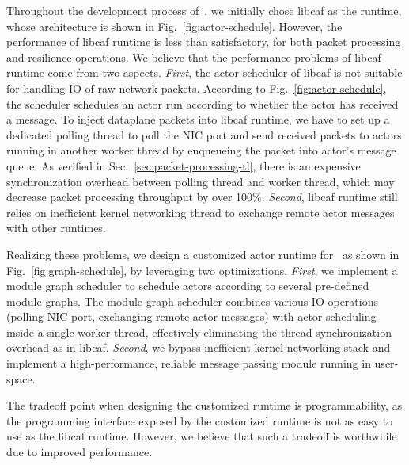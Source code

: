 Throughout the development process of~\nfactor, we initially chose libcaf \cite{caf} as the runtime, whose architecture is shown in Fig.~\ref{fig:actor-schedule}. However, the performance of libcaf \cite{caf} runtime is less than satisfactory, for both packet processing and resilience operations. We believe that the performance problems of libcaf runtime come from two aspects. \textit{First}, the actor scheduler of libcaf is not suitable for handling IO of raw network packets. According to Fig.~\ref{fig:actor-schedule}, the scheduler schedules an actor run according to whether the actor has received a message. To inject dataplane packets into libcaf runtime, we have to set up a dedicated polling thread to poll the NIC port and send received packets to actors running in another worker thread by enqueueing the packet into actor's message queue. As verified in Sec.~\ref{sec:packet-processing-tl}, there is an expensive synchronization overhead between polling thread and worker thread, which may decrease packet processing throughput by over 100\%. \textit{Second}, libcaf runtime still relies on inefficient kernel networking thread to exchange remote actor messages with other runtimes.

Realizing these problems, we design a customized actor runtime for \nfactor~as shown in Fig.~\ref{fig:graph-schedule}, by leveraging two optimizations. \textit{First}, we implement a module graph scheduler to schedule actors according to several pre-defined module graphs. The module graph scheduler combines various IO operations (polling NIC port, exchanging remote actor messages) with actor scheduling inside a single worker thread, effectively eliminating the thread synchronization overhead as in libcaf. \textit{Second}, we bypass inefficient kernel networking stack and implement a high-performance, reliable message passing module running in user-space.

The tradeoff point when designing the customized runtime is programmability, as the programming interface exposed by the customized runtime is not as easy to use as the libcaf runtime. However, we believe that such a tradeoff is worthwhile due to improved performance.


